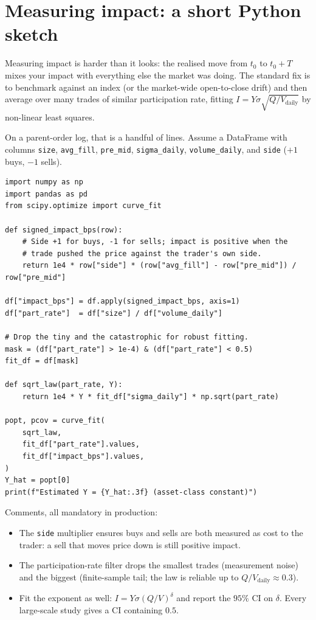 \section{Measuring impact: a short Python sketch}
\label{sec:measuring_sketch}

Measuring impact is harder than it looks: the realised move from
$t_0$ to $t_0+T$ mixes your impact with everything else the market
was doing. The standard fix is to benchmark against an index (or the
market-wide open-to-close drift) and then average over many trades
of similar participation rate, fitting $I = Y \sigma
\sqrt{Q/V_{\text{daily}}}$ by non-linear least squares.

On a parent-order log, that is a handful of lines. Assume a
DataFrame with columns \texttt{size}, \texttt{avg\_fill},
\texttt{pre\_mid}, \texttt{sigma\_daily}, \texttt{volume\_daily},
and \texttt{side} ($+1$ buys, $-1$ sells).

\begin{lstlisting}[caption={Fitting the square-root law to a parent-order log.}]
import numpy as np
import pandas as pd
from scipy.optimize import curve_fit

def signed_impact_bps(row):
    # Side +1 for buys, -1 for sells; impact is positive when the
    # trade pushed the price against the trader's own side.
    return 1e4 * row["side"] * (row["avg_fill"] - row["pre_mid"]) / row["pre_mid"]

df["impact_bps"] = df.apply(signed_impact_bps, axis=1)
df["part_rate"]  = df["size"] / df["volume_daily"]

# Drop the tiny and the catastrophic for robust fitting.
mask = (df["part_rate"] > 1e-4) & (df["part_rate"] < 0.5)
fit_df = df[mask]

def sqrt_law(part_rate, Y):
    return 1e4 * Y * fit_df["sigma_daily"] * np.sqrt(part_rate)

popt, pcov = curve_fit(
    sqrt_law,
    fit_df["part_rate"].values,
    fit_df["impact_bps"].values,
)
Y_hat = popt[0]
print(f"Estimated Y = {Y_hat:.3f} (asset-class constant)")
\end{lstlisting}

Comments, all mandatory in production:
\begin{itemize}
  \item The \texttt{side} multiplier ensures buys and sells are
  both measured as cost to the trader: a sell that moves price down
  is still positive impact.
  \item The participation-rate filter drops the smallest trades
  (measurement noise) and the biggest (finite-sample tail; the law
  is reliable up to $Q/V_{\text{daily}} \approx 0.3$).
  \item Fit the exponent as well: $I = Y \sigma (Q/V)^\delta$ and
  report the $95\%$ CI on $\delta$. Every large-scale study gives a
  CI containing $0.5$.
\end{itemize}

